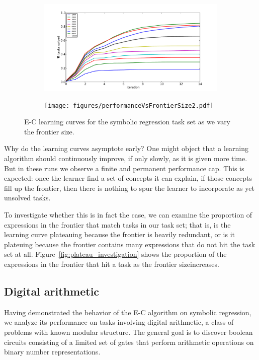 \documentclass{article}
\begin{document}
\begin{figure}
\begin{subfigure}[Before]{0.45\linewidth}
\includegraphics[width=\linewidth]{figures/learningCurves2.pdf}
\end{subfigure}
\begin{subfigure}[After]{0.45\linewidth}
\texttt{[image: figures/performanceVsFrontierSize2.pdf]}
\end{subfigure}
\caption{E-C learning curves for the symbolic regression task set as
  we vary the frontier size.}
\label{fig:symreg} 
\end{figure}




Why do the learning curves asymptote early? One might object that a
learning algorithm should continuously improve, if only slowly, as it
is given more time. But in these runs we observe a finite and
permanent performance cap. This is expected: once the learner find a
set of concepts it can explain, if those concepts fill up the
frontier, then there is nothing to spur the learner to incorporate as
yet unsolved tasks. 

To investigate whether this is in fact the case, we can examine the
proportion of expressions in the frontier that match tasks in our task
set; that is, is the learning curve plateauing because the frontier is
heavily redundant, or is it plateuing because the frontier contains
many expressions that do not hit the task set at
all. Figure~\ref{fig:plateau_investigation} shows the proportion of
the expressions in the frontier that hit a task as the frontier sizeincreases.


\subsection{Digital arithmetic}
Having demonstrated the behavior of the E-C algorithm on symbolic
regression, we analyze its performance on tasks involving digital
arithmetic, a class of problems with known modular structure. The
general goal is to discover boolean circuits consisting of a limited
set of gates that perform arithmetic operations on binary number
representations. 




\nocite{*}
\end{document}
